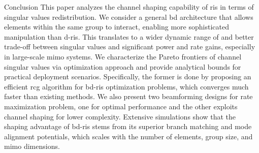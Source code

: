 \documentclass[journal]{IEEEtran}
\begin{document}
\begin{section}{Conclusion}
 This paper analyzes the channel shaping capability of \gls{ris} in terms of singular values redistribution.
 We consider a general \gls{bd} architecture that allows elements within the same group to interact, enabling more sophisticated manipulation than \gls{d}-\gls{ris}.
 This translates to a wider dynamic range of and better trade-off between singular values and significant power and rate gains, especially in large-scale \gls{mimo} systems.
 We characterize the Pareto frontiers of channel singular values via optimization approach and provide analytical bounds for practical deployment scenarios.
 Specifically, the former is done by proposing an efficient \gls{rcg} algorithm for \gls{bd}-\gls{ris} optimization problems, which converges much faster than existing methods.
 We also present two beamforming designs for rate maximization problem, one for optimal performance and the other exploits channel shaping for lower complexity.
 Extensive simulations show that the shaping advantage of \gls{bd}-\gls{ris} stems from its superior branch matching and mode alignment potentials, which scales with the number of elements, group size, and \gls{mimo} dimensions.

\end{section}

\end{document}
